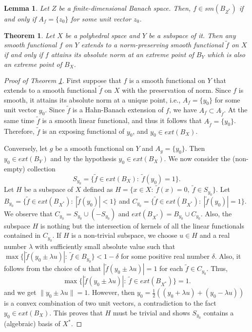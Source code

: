 \documentclass[10pt,a4paper]{amsart}
\newtheorem{theorem}{Theorem}
\newtheorem{lemma}{Lemma}
\begin{document}
\begin{lemma}\label{smooth}
Let $Z$ be a finite-dimensional Banach space. Then, $f\in sm(B_{Z^*})$ if and only if $A_f=\{z_0\}$ for some unit vector $z_0$. 
\end{lemma}

\begin{theorem}\label{smooth HB liftings} 
Let $X$ be a polyhedral space and $Y$ be a subspace of it. Then any smooth functional $f$ on $Y$ extends to a norm-preserving smooth functional $\widetilde{f}$ on $X$ if and only if $f$ attains its absolute norm at an extreme point of $B_Y$ which is also an extreme point of $B_X$.
\end{theorem}

\begin{proof}[Proof of Theorem \ref{smooth HB liftings}]
First suppose that $f$ is a smooth functional on $Y$ that extends to a smooth functional  $\widetilde{f}$ on $X$ with the preservation of norm. Since $f$ is smooth, it attains its absolute norm at a unique point, i.e., $A_f=\{y_0\}$ for some unit vector $y_0$. Since  $\widetilde{f}$ is a Hahn-Banach extension of $f$, we have $A_f\subset A_{\widetilde{f}}$. At the same time $\widetilde{f}$ is a smooth linear functional, and thus it follows that $A_{\widetilde{f}}=\{y_0\}$. Therefore,  $\widetilde{f}$ is an exposing functional of $y_0$, and $y_0\in ext(B_X)$.


\medskip


\noindent Conversely, let $g$ be a smooth functional on $Y$ and $A_g=\{y_0\}$. Then $y_0\in ext(B_Y)$ and by the hypothesis $y_0\in ext(B_X)$. We now consider the (non-empty) collection
\[
S_{y_0}=\{\widetilde{f}\in ext(B_X):~\widetilde{f}(y_0)=1\}.
\]
Let $H$ be a subspace of $X$ defined as $H=\{x\in X:~\widetilde{f}(x)=0,~\widetilde{f}\in S_{y_0}\}$. Let $B_{y_0}=\{\widetilde{f}\in ext(B_{X^*}):~|\widetilde{f}(y_0)|<1\}$ and $C_{y_0}=\{\widetilde{f}\in ext(B_{X^*}):~|\widetilde{f}(y_0)|=1\}$. We observe that $C_{y_0}=S_{y_0}\cup (-S_{y_0})$ and $ext(B_{X^*})=B_{y_0}\cup C_{y_0}$. Also, the subspace $H$ is nothing but the intersection of kernels of all the linear functionals contained in $C_{y_0}$. If $H$ is a non-trivial subspace, we choose $u\in H$ and a real number $\lambda$ with sufficiently small absolute value such that $\max\{|\widetilde{f}(y_0\pm \lambda u)|:~\widetilde{f}\in B_{y_0}\}<1-\delta$ for some positive real number $\delta$. Also, it follows from the choice of $u$ that $|\widetilde{f}(y_0\pm \lambda u)|=1$ for each $\widetilde{f}\in C_{y_0}$. Thus,
\[
\max\{|\widetilde{f}(y_0\pm \lambda u)|:~\widetilde{f}\in ext(B_{X^*})\}=1.
\]
and we get $\|y_0\pm \lambda u\|=1$. However, then $y_0=\frac{1}{2}((y_0+\lambda u)+(y_0-\lambda u))$ is a convex combination of two unit vectors, a contradiction to the fact $y_0\in ext(B_X)$. This proves that $H$ must be trivial and shows $S_{y_0}$ contains a (algebraic) basis of $X^*$.



\end{proof}
\end{document}
